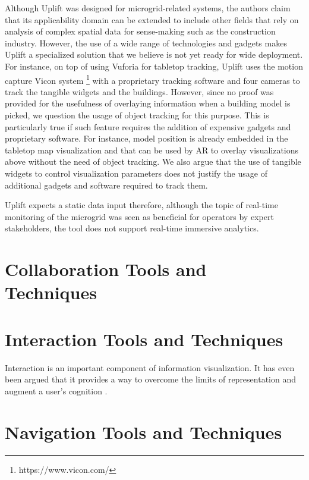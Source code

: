 \documentclass{vgtc}                          %
\begin{document}
\noindent Although Uplift was designed for microgrid-related systems,
the authors claim that its applicability domain can be extended to include
other fields that rely on analysis of complex spatial data for sense-making
such as the construction industry. However, the use of a wide range of technologies
and gadgets makes Uplift a specialized solution that we believe is not yet
ready for wide deployment. For instance, on top of using Vuforia for tabletop
tracking, Uplift uses the motion capture Vicon system
\footnote{https://www.vicon.com/} with a proprietary tracking software and four
cameras to track the tangible widgets and the buildings. However,
since no proof was provided for the usefulness of overlaying information when
a building model is picked, we question the usage of object tracking for this
purpose. This is particularly true if such feature requires the addition of
expensive gadgets and proprietary software. For instance, model position is
already embedded in the tabletop map visualization and that can be used by AR
to overlay visualizations above without the need of object tracking. We also
argue that the use of tangible widgets to control visualization parameters does
not justify the usage of additional gadgets and software required to track
them.

\medskip

\noindent Uplift expects a static data input therefore, although the topic of
real-time monitoring of the microgrid was seen as beneficial for operators by
expert stakeholders, the tool does not support real-time immersive analytics.

\section{Collaboration Tools and Techniques}

\section{Interaction Tools and Techniques}

Interaction is an important component of information visualization. It has even
been argued that it provides a way to overcome the limits of representation and
augment a user's cognition \cite{interaction_infovis}.

\section{Navigation Tools and Techniques}
\end{document}
